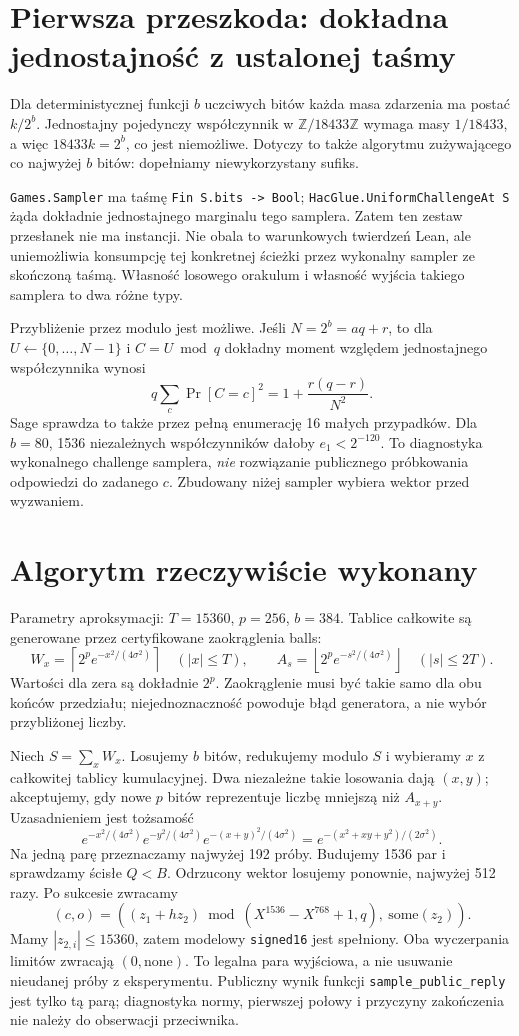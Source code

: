 \documentclass[11pt,a4paper]{article}
\newcommand{\code}[1]{\nolinkurl{#1}}
\begin{document}
\section{Pierwsza przeszkoda: dokładna jednostajność z ustalonej taśmy}
Dla deterministycznej funkcji $b$ uczciwych bitów każda masa zdarzenia
ma postać $k/2^b$. Jednostajny pojedynczy współczynnik w
$\mathbb Z/18433\mathbb Z$ wymaga masy $1/18433$, a więc
$18433k=2^b$, co jest niemożliwe. Dotyczy to także algorytmu zużywającego
co najwyżej $b$ bitów: dopełniamy niewykorzystany sufiks.

\code{Games.Sampler} ma taśmę \code{Fin S.bits -> Bool};
\code{HacGlue.UniformChallengeAt S} żąda dokładnie jednostajnego marginalu
tego samplera. Zatem ten zestaw przesłanek nie ma instancji.
Nie obala to warunkowych twierdzeń Lean, ale uniemożliwia konsumpcję tej
konkretnej ścieżki przez wykonalny sampler ze skończoną taśmą.
Własność losowego orakulum i własność wyjścia takiego samplera to dwa różne typy.

Przybliżenie przez modulo jest możliwe. Jeśli $N=2^b=aq+r$, to dla
$U\leftarrow\{0,\ldots,N-1\}$ i $C=U\bmod q$ dokładny moment względem
jednostajnego współczynnika wynosi
\[
 q\sum_c\Pr[C=c]^2=1+\frac{r(q-r)}{N^2}.
\]
Sage sprawdza to także przez pełną enumerację 16 małych przypadków.
Dla $b=80$, 1536 niezależnych współczynników dałoby $e_1<2^{-120}$.
To diagnostyka wykonalnego challenge samplera, \emph{nie} rozwiązanie
publicznego próbkowania odpowiedzi do zadanego $c$.
Zbudowany niżej sampler wybiera wektor przed wyzwaniem.

\section{Algorytm rzeczywiście wykonany}
Parametry aproksymacji: $T=15360$, $p=256$, $b=384$.
Tablice całkowite są generowane przez certyfikowane zaokrąglenia balls:
\[
 W_x=\left\lceil2^p e^{-x^2/(4\sigma^2)}\right\rceil\quad(|x|\le T),
 \qquad A_s=\left\lfloor2^p e^{-s^2/(4\sigma^2)}\right\rfloor
 \quad(|s|\le2T).
\]
Wartości dla zera są dokładnie $2^p$.
Zaokrąglenie musi być takie samo dla obu końców przedziału; niejednoznaczność
powoduje błąd generatora, a nie wybór przybliżonej liczby.

Niech $S=\sum_xW_x$. Losujemy $b$ bitów, redukujemy modulo $S$
i wybieramy $x$ z całkowitej tablicy kumulacyjnej. Dwa niezależne takie
losowania dają $(x,y)$; akceptujemy, gdy nowe $p$ bitów reprezentuje
liczbę mniejszą niż $A_{x+y}$. Uzasadnieniem jest tożsamość
\[
 e^{-x^2/(4\sigma^2)}e^{-y^2/(4\sigma^2)}e^{-(x+y)^2/(4\sigma^2)}
 =e^{-(x^2+xy+y^2)/(2\sigma^2)}.
\]
Na jedną parę przeznaczamy najwyżej 192 próby.
Budujemy 1536 par i sprawdzamy ścisłe $Q<B$.
Odrzucony wektor losujemy ponownie, najwyżej 512 razy.
Po sukcesie zwracamy
\[
 (c,o)=\left((z_1+h z_2)\bmod(X^{1536}-X^{768}+1,q),\ \mathrm{some}(z_2)\right).
\]
Mamy $|z_{2,i}|\le15360$, zatem modelowy \code{signed16} jest spełniony.
Oba wyczerpania limitów zwracają $(0,\mathrm{none})$.
To legalna para wyjściowa, a nie usuwanie nieudanej próby z eksperymentu.
Publiczny wynik funkcji \code{sample_public_reply} jest tylko tą parą;
diagnostyka normy, pierwszej połowy i przyczyny zakończenia nie należy
do obserwacji przeciwnika.
\end{document}
